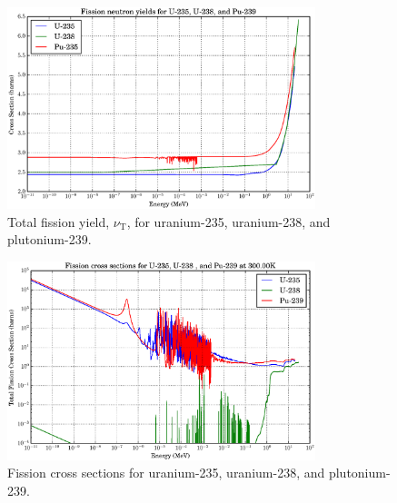 \begin{figure}[h!]
  \label{nu_compare}
  \centering
    \includegraphics[width=0.8\textwidth]{graphics/nu_compare.eps}
     \caption{Total fission yield, $\nu_\mathrm{T}$, for uranium-235, uranium-238, and plutonium-239.}
\end{figure}

\begin{figure}[h!]
  \label{xs_fission_only}
  \centering
    \includegraphics[width=0.8\textwidth]{graphics/xs_fissile.eps}
     \caption{Fission cross sections for uranium-235, uranium-238, and plutonium-239.}
\end{figure}

